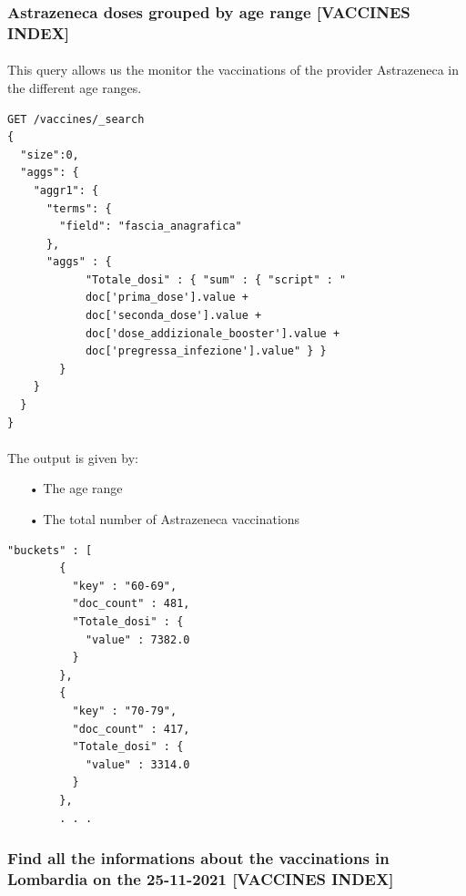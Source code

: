 \documentclass[a4paper,12pt]{article}
\begin{document}
\subsubsection{Astrazeneca doses grouped by age range [VACCINES INDEX]}
\paragraph{} This query allows us the monitor the vaccinations of the provider Astrazeneca in the different age ranges.
\begin{tcolorbox}[colback=green!5!white,colframe=green!75!black,title=QUERY]
\begin{verbatim}
GET /vaccines/_search
{
  "size":0,
  "aggs": {
    "aggr1": {
      "terms": {
        "field": "fascia_anagrafica"
      },
      "aggs" : {
            "Totale_dosi" : { "sum" : { "script" : "
            doc['prima_dose'].value + 
            doc['seconda_dose'].value + 
            doc['dose_addizionale_booster'].value + 
            doc['pregressa_infezione'].value" } }
        }
    }
  }
}
\end{verbatim}
\end{tcolorbox}
\paragraph{} The output is given by: 
\begin{itemize}
\item[•] The age range
\item[•] The total number of Astrazeneca vaccinations
\end{itemize}
\begin{tcolorbox}[colback=red!5!white,colframe=red!75!black,title=OUTPUT]
\begin{verbatim}
"buckets" : [
        {
          "key" : "60-69",
          "doc_count" : 481,
          "Totale_dosi" : {
            "value" : 7382.0
          }
        },
        {
          "key" : "70-79",
          "doc_count" : 417,
          "Totale_dosi" : {
            "value" : 3314.0
          }
        },
        . . .
\end{verbatim}
\end{tcolorbox}

\subsubsection{Find all the informations about the vaccinations in Lombardia on the 25-11-2021 [VACCINES INDEX]}
\end{document}
